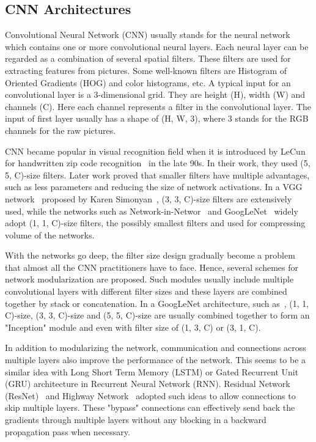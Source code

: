 \documentclass[10pt,twocolumn,letterpaper]{article}
\begin{document}
\subsection{CNN Architectures}
Convolutional Neural Network (CNN) usually stands for the neural network which contains one or more convolutional neural layers. Each neural layer can be regarded as a combination of several spatial filters. These filters are used for extracting features from pictures. Some well-known filters are Histogram of Oriented Gradients (HOG) and color histograms, etc. A typical input for an convolutional layer is a 3-dimensional grid. They are height (H), width (W) and channels (C). Here each channel represents a filter in the convolutional layer. The input of first layer usually has a shape of (H, W, 3), where 3 stands for the RGB channels for the raw pictures.

CNN became popular in visual recognition field when it is introduced by LeCun \etal for handwritten zip code recognition~\cite{lecun1989backpropagation} in the late 90s. In their work, they used (5, 5, C)-size filters. Later work proved that smaller filters have multiple advantages, such as less parameters and reducing the size of network activations. In a VGG network~\cite{simonyan2014very} proposed by Karen Simonyan~\etal, (3, 3, C)-size filters are extensively used, while the networks such as Network-in-Networ~\cite{lin2013network} and GoogLeNet~\cite{szegedy2015going} widely adopt (1, 1, C)-size filters, the possibly smallest filters and used for compressing volume of the networks.

With the networks go deep, the filter size design gradually become a problem that almost all the CNN practitioners have to face. Hence, several schemes for network modularization are proposed. Such modules usually include multiple convolutional layers with different filter sizes and these layers are combined together by stack or concatenation. In a GoogLeNet architecture, such as~\cite{szegedy2015going, szegedy2016rethinking}, (1, 1, C)-size, (3, 3, C)-size and (5, 5, C)-size are usually combined together to form an "Inception" module and even with filter size of (1, 3, C) or (3, 1, C).

In addition to modularizing the network, communication and connections across multiple layers also improve the performance of the network. This seems to be a similar idea with Long Short Term Memory (LSTM) or Gated Recurrent Unit (GRU) architecture in Recurrent Neural Network (RNN). Residual Network (ResNet)~\cite{he2016deep} and Highway Network~\cite{srivastava2015highway} adopted such ideas to allow connections to skip multiple layers. These "bypass" connections can effectively send back the gradients through multiple layers without any blocking in a backward propagation pass when necessary.
\end{document}
